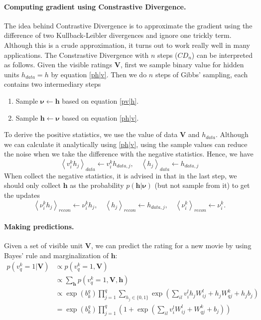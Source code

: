 \documentclass[bj, preprint]{imsart}
\newcommand{\cexp}[1]{\left<#1\right>}
\begin{document}
\paragraph{Computing gradient using Constrastive Divergence.}\label{par:method.models.rbm.grad}

The idea behind Contrastive Divergence \citep{hinton2012practical} is to approximate the gradient using the difference of two Kullback-Leibler divergences and ignore one trickly term. Although this is a crude approximation, it turns out to work really well in many applications. The Constrastive Divergence with $n$ steps ($CD_n$) can be interpreted as follows. Given the visible ratings $\textbf{V}$, first we sample binary value for hidden units $h_{data} = h$ by equation \eqref{ph|v}. Then we do $n$ steps of Gibbs' sampling, each contains two intermediary steps
\begin{enumerate}
	\item Sample $\boldsymbol{\nu} \leftarrow \boldsymbol{h}$ based on equation \eqref{pv|h}.
	\item Sample $\boldsymbol{h} \leftarrow \boldsymbol{\nu}$ based on equation \eqref{ph|v}.
\end{enumerate}
To derive the positive statistics, we use the value of data $\textbf{V}$ and $h_{data}$. Although we can calculate it analytically using \eqref{ph|v}, using the sample values can reduce the noise when we take the difference with the negative statistics. Hence, we have
$$\cexp{v_i^k h_j}_{data} \leftarrow v_i^k h_{data, j}, \quad \cexp{h_j}_{data} \leftarrow h_{data, j}$$
When collect the negative statistics, it is advised in \cite{hinton2012practical} that in the last step, we should only collect $\boldsymbol{h}$ as the probability $p(\textbf{h}|\boldsymbol{\nu})$ (but not sample from it) to get the updates
$$\cexp{\nu_i^k h_j}_{recon} \leftarrow \nu_i^k h_{j},\quad \cexp{h_j}_{recon} \leftarrow h_{data, j},\quad \cexp{\nu_i^k}_{recon} \leftarrow \nu_i^k.$$

\paragraph{Making predictions.}\label{par:method.models.rbm.pred}

Given a set of visible unit $\textbf{V}$, we can predict the rating for a new movie by using Bayes' rule and marginalization of $\textbf{h}$:
\begin{align*}
p(v_q^{k} =  1 |\textbf{V}) & \propto p(v_q^{k} = 1, \textbf{V})  \\
&  \propto \sum_{\textbf{h}} p(v_q^{k} = 1, \textbf{V}, \textbf{h})\\
& \propto \exp(b_k^q) \prod_{j=1}^{q} \sum_{h_j\in \{0,1\}} \exp(\sum_{il} v_i^{l} h_j W_{ij}^{l} + h_j W_{qj}^{k} + h_jb_j)\\
& = \exp(b_k^q) \prod_{j=1}^{q} \left( 1 +  \exp(\sum_{il} v_i^{l} W_{ij}^{l} +  W_{qj}^{k} + b_j)\right)
\end{align*}
\end{document}
